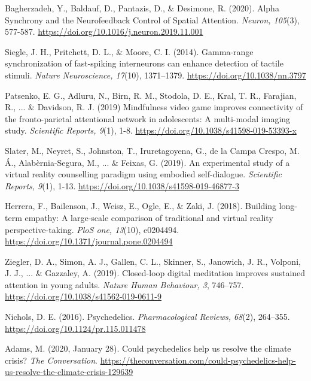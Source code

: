 \documentclass[12pt,a4paper]{report}
\begin{document}
{\begin{compactenum}[i)]
  \item Bagherzadeh, Y., Baldauf, D., Pantazis, D., \& Desimone, R. (2020). Alpha Synchrony and the Neurofeedback Control of Spatial Attention. \emph{Neuron, 105}(3), 577-587. \url{https://doi.org/10.1016/j.neuron.2019.11.001}
  \item Siegle, J. H., Pritchett, D. L., \& Moore, C. I. (2014). Gamma-range synchronization of fast-spiking interneurons can enhance detection of tactile stimuli. \emph{Nature Neuroscience, 17}(10), 1371–1379. \url{https://doi.org/10.1038/nn.3797}
  \item Patsenko, E. G., Adluru, N., Birn, R. M., Stodola, D. E., Kral, T. R., Farajian, R., ... \& Davidson, R. J. (2019) Mindfulness video game improves connectivity of the fronto-parietal attentional network in adolescents: A multi-modal imaging study. \emph{Scientific Reports, 9}(1), 1-8. \url{https://doi.org/10.1038/s41598-019-53393-x}
  \item Slater, M., Neyret, S., Johnston, T., Iruretagoyena, G., de la Campa Crespo, M. Á., Alabèrnia-Segura, M., ... \& Feixas, G. (2019). An experimental study of a virtual reality counselling paradigm using embodied self-dialogue. \emph{Scientific Reports, 9}(1), 1-13. \url{https://doi.org/10.1038/s41598-019-46877-3}
  \item Herrera, F., Bailenson, J., Weisz, E., Ogle, E., \& Zaki, J. (2018). Building long-term empathy: A large-scale comparison of traditional and virtual reality perspective-taking. \emph{PloS one, 13}(10), e0204494. \url{https://doi.org/10.1371/journal.pone.0204494}
  \item Ziegler, D. A., Simon, A. J., Gallen, C. L., Skinner, S., Janowich, J. R., Volponi, J. J., ... \& Gazzaley, A. (2019). Closed-loop digital meditation improves sustained attention in young adults. \emph{Nature Human Behaviour, 3}, 746–757. \url{https://doi.org/10.1038/s41562-019-0611-9}
  \item Nichols, D. E. (2016). Psychedelics. \emph{Pharmacological Reviews, 68}(2), 264–355. \url{https://doi.org/10.1124/pr.115.011478}
  \item Adams, M. (2020, January 28). Could psychedelics help us resolve the climate crisis? \emph{The Conversation}. \url{https://theconversation.com/could-psychedelics-help-us-resolve-the-climate-crisis-129639}
\end{compactenum}\vspace{-1.3em}}
\end{document}
